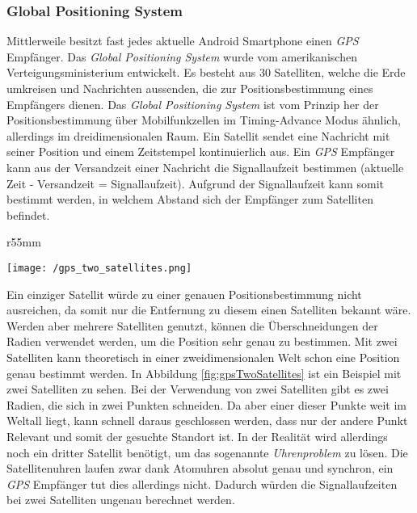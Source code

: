 \subsubsection{Global Positioning System}
Mittlerweile besitzt fast jedes aktuelle Android Smartphone einen \textit{GPS} Empfänger. 
Das \textit{Global Positioning System} wurde vom amerikanischen Verteigungsministerium entwickelt. Es besteht aus 30 Satelliten, welche die Erde umkreisen und Nachrichten aussenden, die zur Positionsbestimmung eines Empfängers dienen. Das \textit{Global Positioning System} ist vom Prinzip her der Positionsbestimmung über Mobilfunkzellen im Timing-Advance Modus ähnlich, allerdings im dreidimensionalen Raum. 
Ein Satellit sendet eine Nachricht mit seiner Position und einem Zeitstempel kontinuierlich aus.
Ein \textit{GPS} Empfänger kann aus der Versandzeit einer Nachricht die Signallaufzeit bestimmen (aktuelle Zeit - Versandzeit = Signallaufzeit). Aufgrund der Signallaufzeit kann somit bestimmt werden, in welchem Abstand sich der Empfänger zum Satelliten befindet. 
\begin{wrapfigure}{r}{55mm}
\centering
   \begin{center}
   	\texttt{[image: /gps\_two\_satellites.png]} 
   \end{center}
   \caption[Lokalisierung: GPS 2 Satelliten]{GPS 2 Satelliten}
   \label{fig:gpsTwoSatellites}
\end{wrapfigure}
Ein einziger Satellit würde zu einer genauen Positionsbestimmung nicht ausreichen, da somit nur die Entfernung zu diesem einen Satelliten bekannt wäre. Werden aber mehrere Satelliten genutzt, können die Überschneidungen der Radien verwendet werden, um die Position sehr genau zu bestimmen. Mit zwei Satelliten kann theoretisch in einer zweidimensionalen Welt schon eine Position genau bestimmt werden. In Abbildung \ref{fig:gpsTwoSatellites} ist ein Beispiel mit zwei Satelliten zu sehen. Bei der Verwendung von zwei Satelliten gibt es zwei Radien, die sich in zwei Punkten schneiden. Da aber einer dieser Punkte weit im Weltall liegt, kann schnell daraus geschlossen werden, dass nur der andere Punkt Relevant und somit der gesuchte Standort ist. In der Realität wird allerdings noch ein dritter Satellit benötigt, um das sogenannte \textit{Uhrenproblem} zu lösen. Die Satellitenuhren laufen zwar dank Atomuhren absolut genau und synchron, ein \textit{GPS} Empfänger tut dies allerdings nicht. Dadurch würden die Signallaufzeiten bei zwei Satelliten ungenau berechnet werden. 

